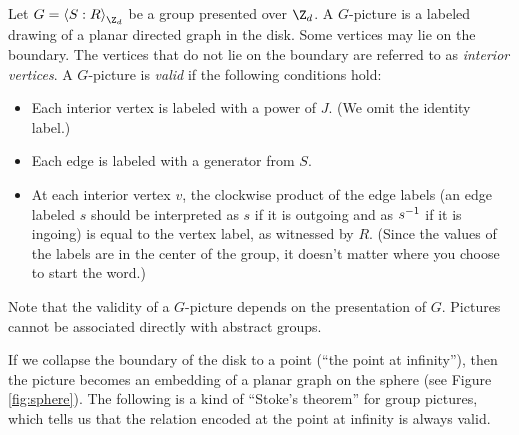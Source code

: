 \begin{definition}
	Let $G = \Braket{S:R}_{\Z_d}$ be a group presented over $\Z_d$. A $G$-picture is a labeled drawing of a planar directed graph in the disk. Some vertices may lie on the boundary. The vertices that do not lie on the boundary are referred to as \emph{interior vertices}. A $G$-picture is \emph{valid} if the following conditions hold:
	\begin{itemize}
		\item Each interior vertex is labeled with a power of $J$. (We omit the identity label.)
		\item Each edge is labeled with a generator from $S$.
		\item At each interior vertex $v$, 
		the clockwise product of the edge labels (an edge labeled $s$ should be interpreted as $s$ if it is outgoing and as $s^{-1}$ if it is ingoing) is equal to the vertex label, as witnessed by $R$. (Since the values of the labels are in the center of the group, it doesn't matter where you choose to start the word.)
	\end{itemize}
\end{definition}
Note that the validity of a $G$-picture depends on the presentation of $G$. Pictures cannot be associated directly with abstract groups.

If we collapse the boundary of the disk to a point (``the point at infinity''), then the picture becomes an embedding of a planar graph on the sphere (see Figure \ref{fig:sphere}). The following is a kind of ``Stoke's theorem'' for group pictures, which tells us that the relation encoded at the point at infinity is always valid.


